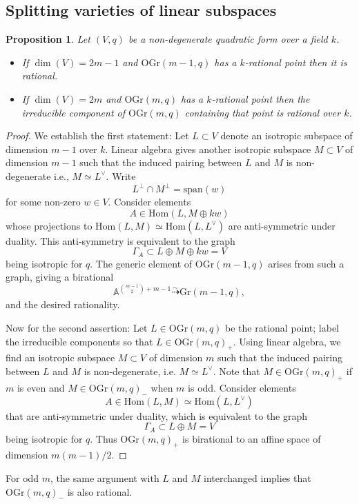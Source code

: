 \documentclass[12pt]{amsart}
\numberwithin{equation}{section}
\newcommand{\bA}{\mathbb{A}}
\newcommand{\Gr}{\mathrm{Gr}}
\newcommand{\Hom}{\mathrm{Hom}}
\newcommand{\OGr}{\mathrm{OGr}}
\newcommand{\spa}{\mathrm{span}}
\theoremstyle{plain}
\newtheorem{prop}{Proposition}[section]
\theoremstyle{definition}
\theoremstyle{remark}
\begin{document}
\subsection*{Splitting varieties of linear subspaces}
\begin{prop}
\label{prop:linalg}
Let $(V,q)$ be a non-degenerate quadratic form over a field $k$.
\begin{itemize}
\item{If $\dim(V)=2m-1$ and $\OGr(m-1,q)$ has a $k$-rational point then it is rational.}
\item{If $\dim(V)=2m$ and $\OGr(m,q)$ has a $k$-rational
point then the irreducible component of $\OGr(m,q)$ 
containing that point is rational over $k$.}
\end{itemize}
\end{prop}
\begin{proof}
We establish the first statement:
Let $L \subset V$ denote an isotropic subspace of dimension
$m-1$ over $k$. Linear algebra gives another isotropic
subspace $M \subset V$ of dimension $m-1$ such that
the induced pairing between $L$ and $M$ is non-degenerate
i.e., $M\simeq L^{\vee}$. Write
$$L^{\perp} \cap M^{\perp} = \spa(w)$$
for some non-zero $w \in V$.
Consider elements
$$A \in \Hom(L,M\oplus k w)$$
whose projections to $\Hom(L,M)\simeq \Hom(L,L^{\vee})$
are anti-symmetric under duality. 
This anti-symmetry is equivalent to the graph
$$\Gamma_A \subset L \oplus M \oplus k w = V$$
being isotropic for $q$.
The generic element of $\OGr(m-1,q)$ arises from such
a graph, giving a birational
$$\bA^{\binom{m-1}{2} + m-1} \stackrel{\sim}{\dashrightarrow}
\Gr(m-1,q),$$
and the desired rationality.

Now for the second assertion:
Let $L \in \OGr(m,q)$ be the rational point;
label the irreducible components so that 
$L \in \OGr(m,q)_+$.
Using linear algebra, we find an isotropic subspace
$M \subset V$ of dimension $m$ such that the
induced pairing between $L$ and $M$ is non-degenerate, i.e. $M\simeq L^{\vee}$. Note that $M \in \OGr(m,q)_+$
if $m$ is even and $M \in \OGr(m,q)_-$ 
when $m$ is odd.  Consider elements
$$A \in \Hom(L,M)\simeq \Hom(L,L^{\vee})$$
that are anti-symmetric under duality, which is equivalent to the graph
$$\Gamma_A \subset L \oplus M = V$$
being isotropic for $q$. Thus 
$\OGr(m,q)_+$ is birational to an affine
space of dimension $m(m-1)/2$. 
\end{proof}
For odd $m$, the same argument with $L$
and $M$ interchanged implies that $\OGr(m,q)_-$
is also rational. 
\end{document}
